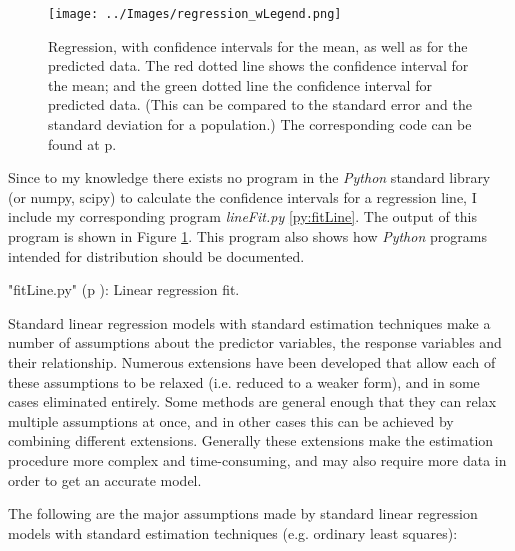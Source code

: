 \begin{figure}
  \centering
  \texttt{[image: ../Images/regression\_wLegend.png]}\\
  \caption{Regression, with confidence intervals for the mean, as well as for the predicted data. The red dotted line shows the confidence interval for the mean; and the green dotted line the confidence interval for predicted data. (This can be compared to the standard error and the standard deviation for a population.) The corresponding code can be found
  at p. \pageref{py:fitLine}} \label{fig:regline}
\end{figure}

Since to my knowledge there exists no program in the \emph{Python} standard library (or numpy, scipy) to calculate the confidence intervals for a regression line, I include my corresponding program \emph{lineFit.py} \ref{py:fitLine}. The output of this program is shown in Figure \ref{fig:regline}. This program also shows how \emph{Python} programs intended for distribution should be documented.

\PyImg "fitLine.py" (p \pageref{py:fitLine}): Linear regression fit.




Standard linear regression models with standard estimation techniques make a number of assumptions about the predictor variables, the response variables and their relationship.  Numerous extensions have been developed that allow each of these assumptions to be relaxed (i.e. reduced to a weaker form), and in some cases eliminated entirely.  Some methods are general enough that they can relax multiple assumptions at once, and in other cases this can be achieved by combining different extensions.  Generally these extensions make the estimation procedure more complex and time-consuming, and may also require more data in order to get an accurate model.

The following are the major assumptions made by standard linear regression models with standard estimation techniques (e.g. ordinary least squares):

